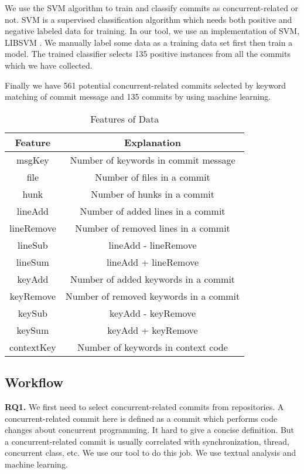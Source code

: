 We use the SVM \cite{journals/ml/CortesV95} algorithm to train and classify commits as concurrent-related or not. SVM is a supervised classification algorithm which needs both positive and negative labeled data for training. In our tool, we use an implementation of SVM, LIBSVM \cite{libsvm}. We manually label some data as a training data set first then train a model. The trained classifier selects 135 positive instances from all the commits which we have collected.

Finally we have 561 potential concurrent-related commits selected by keyword matching of commit message and 135 commits by using machine learning.

\begin{table}
	\centering
	\caption{Features of Data}
	\begin{tabular}{|c|c|}\hline
		Feature&Explanation\\\hline
		msgKey&Number of keywords in commit message\\\hline
		file&Number of files in a commit\\\hline
		hunk&Number of hunks in a commit\\\hline
		lineAdd&Number of added lines in a commit\\\hline
		lineRemove&Number of removed lines in a commit\\\hline
		lineSub&lineAdd - lineRemove\\\hline
		lineSum&lineAdd + lineRemove\\\hline
		keyAdd&Number of added keywords in a commit\\\hline
		keyRemove&Number of removed keywords in a commit\\\hline
		keySub&keyAdd - keyRemove\\\hline
		keySum&keyAdd + keyRemove\\\hline
		contextKey&Number of keywords in context code\\\hline
	\end{tabular}
\end{table}

\subsection{Workflow}

\textbf{RQ1.} We first need to select concurrent-related commits from repositories. A concurrent-related commit here is defined as a commit which performs code changes about concurrent programming. It hard to give a concise definition. But a concurrent-related commit is usually correlated with synchronization, thread, concurrent class, etc. We use our tool to do this job. We use textual analysis and machine learning.

